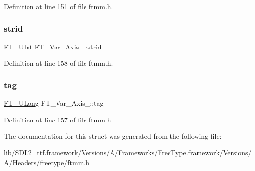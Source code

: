 Definition at line 151 of file ftmm.\+h.

\mbox{\label{struct_f_t___var___axis___a297d28ab0f5666e56d7575249ccc75d7}} 
\subsubsection{\texorpdfstring{strid}{strid}}
{\footnotesize\ttfamily \mbox{\hyperlink{fttypes_8h_abcb8db4dbf35d2b55a9e8c7b0926dc52}{F\+T\+\_\+\+U\+Int}} F\+T\+\_\+\+Var\+\_\+\+Axis\+\_\+\+::strid}



Definition at line 158 of file ftmm.\+h.

\mbox{\label{struct_f_t___var___axis___a01ef9396e34e740c2d2b8c7117094624}} 
\subsubsection{\texorpdfstring{tag}{tag}}
{\footnotesize\ttfamily \mbox{\hyperlink{fttypes_8h_a4fac88bdba78eb76b505efa6e4fbf3f5}{F\+T\+\_\+\+U\+Long}} F\+T\+\_\+\+Var\+\_\+\+Axis\+\_\+\+::tag}



Definition at line 157 of file ftmm.\+h.



The documentation for this struct was generated from the following file\+:\begin{DoxyCompactItemize}
\item 
lib/\+S\+D\+L2\+\_\+ttf.\+framework/\+Versions/\+A/\+Frameworks/\+Free\+Type.\+framework/\+Versions/\+A/\+Headers/freetype/\mbox{\hyperlink{ftmm_8h}{ftmm.\+h}}\end{DoxyCompactItemize}
